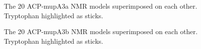			\setlength\fboxsep{5pt}
			\setlength\fboxrule{1.5pt}
			\begin{figure}[]
			\centering
			\caption[The 20 ACP-mupA3a NMR models superimposed on each other. Tryptophan highlighted as sticks.]{The 20 ACP-mupA3a NMR models superimposed on each other. Tryptophan highlighted as sticks.}
			\label{fig:acp3nmr}
			\end{figure}			
	
			\setlength\fboxsep{5pt}
			\setlength\fboxrule{1.5pt}
			\begin{figure}[]
			\centering
			\caption[The 20 ACP-mupA3b NMR models superimposed on each other. Tryptophan highlighted as sticks.]{The 20 ACP-mupA3b NMR models superimposed on each other. Tryptophan highlighted as sticks.}
			\label{fig:acp4nmr}
			\end{figure}					
	
